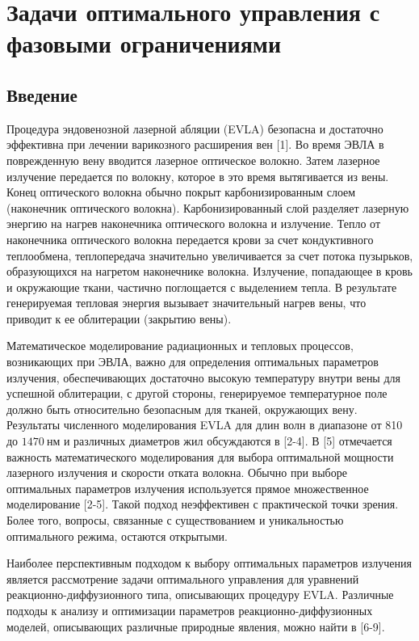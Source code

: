 \section{
    Задачи оптимального управления с фазовыми ограничениями
}\label{sec:ch3:sec2}

\subsection{Введение}\label{subsec:ch3:sec2:subsec1}
Процедура эндовенозной лазерной абляции (EVLA) безопасна и достаточно
эффективна при лечении варикозного расширения вен [1].
Во время ЭВЛА в поврежденную вену вводится лазерное оптическое волокно.
Затем лазерное излучение передается по волокну, которое в это время вытягивается из вены.
Конец оптического волокна обычно покрыт карбонизированным слоем (наконечник оптического волокна).
Карбонизированный слой разделяет лазерную энергию на нагрев наконечника оптического волокна и излучение.
Тепло от наконечника оптического волокна передается крови за счет кондуктивного теплообмена,
теплопередача значительно увеличивается за счет потока пузырьков,
образующихся на нагретом наконечнике волокна.
Излучение, попадающее в кровь и окружающие ткани, частично поглощается с выделением тепла.
В результате генерируемая тепловая энергия вызывает значительный нагрев вены,
что приводит к ее облитерации (закрытию вены).


Математическое моделирование радиационных и тепловых процессов, возникающих при ЭВЛА,
важно для определения оптимальных параметров излучения, обеспечивающих достаточно
высокую температуру внутри вены для успешной облитерации, с другой стороны,
генерируемое температурное поле должно быть относительно безопасным для тканей, окружающих вену.
Результаты численного моделирования EVLA для длин волн в диапазоне от
810 до $1470 \mathrm{~нм}$ и различных диаметров жил обсуждаются в [2-4].
В [5] отмечается важность математического моделирования для выбора оптимальной
мощности лазерного излучения и скорости отката волокна.
Обычно при выборе оптимальных параметров излучения
используется прямое множественное моделирование [2-5].
Такой подход неэффективен с практической точки зрения.
Более того, вопросы, связанные с существованием и
уникальностью оптимального режима, остаются открытыми.


Наиболее перспективным подходом к выбору оптимальных параметров излучения является
рассмотрение задачи оптимального управления для уравнений
реакционно-диффузионного типа, описывающих процедуру EVLA.
Различные подходы к анализу и оптимизации параметров реакционно-диффузионных моделей,
описывающих различные природные явления, можно найти в [6-9].

